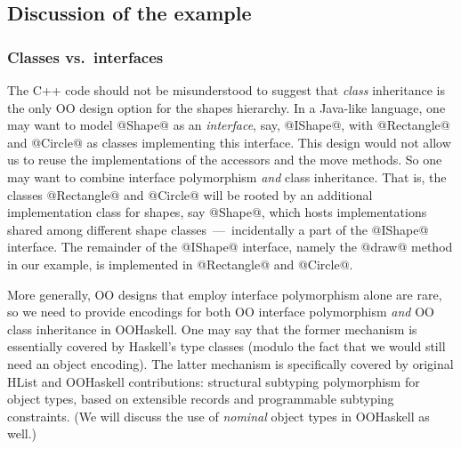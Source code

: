 \documentclass{jfp}
\begin{document}



\subsection{Discussion of the example}

\subsubsection{Classes vs.\ interfaces}

The C++ code should not be misunderstood to suggest that \emph{class}
inheritance is the only OO design option for the shapes hierarchy. In
a Java-like language, one may want to model @Shape@ as an
\emph{interface}, say, @IShape@, with @Rectangle@ and @Circle@ as classes
implementing this interface. This design would not allow us to reuse
the implementations of the accessors and the move methods. So one may
want to combine interface polymorphism \emph{and} class
inheritance. That is, the classes @Rectangle@ and @Circle@ will be
rooted by an additional implementation class for shapes, say @Shape@,
which hosts implementations shared among different shape
classes~---~incidentally a part of the @IShape@ interface. The
remainder of the @IShape@ interface, namely the @draw@ method in our
example, is implemented in @Rectangle@ and @Circle@.

More generally, OO designs that employ interface polymorphism alone
are rare, so we need to provide encodings for both OO interface
polymorphism \emph{and} OO class inheritance in OOHaskell. One may say
that the former mechanism is essentially covered by Haskell's type
classes (modulo the fact that we would still need an object
encoding). The latter mechanism is specifically covered by original
HList and OOHaskell contributions: structural subtyping polymorphism
for object types, based on extensible records and programmable
subtyping constraints. (We will discuss the use of \emph{nominal}
object types in OOHaskell as well.)



\end{document}
